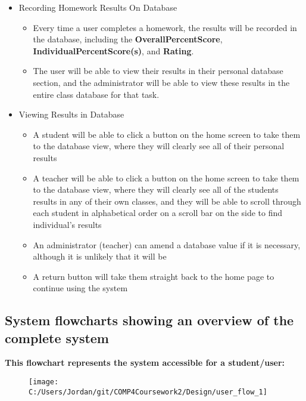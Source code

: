 \begin{itemize}
	\item Recording Homework Results On Database
	\begin{itemize}
		\item Every time a user completes a homework, the results will be recorded in the database, including the \textbf{OverallPercentScore}, \textbf{IndividualPercentScore(s)}, and \textbf{Rating}. 
		\item The user will be able to view their results in their personal database section, and the administrator will be able to view these results in the entire class database for that task.
	\end{itemize}
\end{itemize}

\begin{itemize}
	\item Viewing Results in Database
	\begin{itemize}
		\item A student will be able to click a button on the home screen to take them to the database view, where they will clearly see all of their personal results
		\item A teacher will be able to click a button on the home screen to take them to the database view, where they will clearly see all of the students results in any of their own classes, and they will be able to scroll through each student in alphabetical order on a scroll bar on the side to find individual's results
		\item An administrator (teacher) can amend a database value if it is necessary, although it is unlikely that it will be
		\item A return button will take them straight back to the home page to continue using the system
	\end{itemize}
\end{itemize}

\subsection{System flowcharts showing an overview of the complete system}

\textbf{This flowchart represents the system accessible for a student/user: }


\begin{figure}[H]
    \texttt{[image: C:/Users/Jordan/git/COMP4Coursework2/Design/user\_flow\_1]}
    \label{fig:print_function_result}\caption{}
\end{figure}

